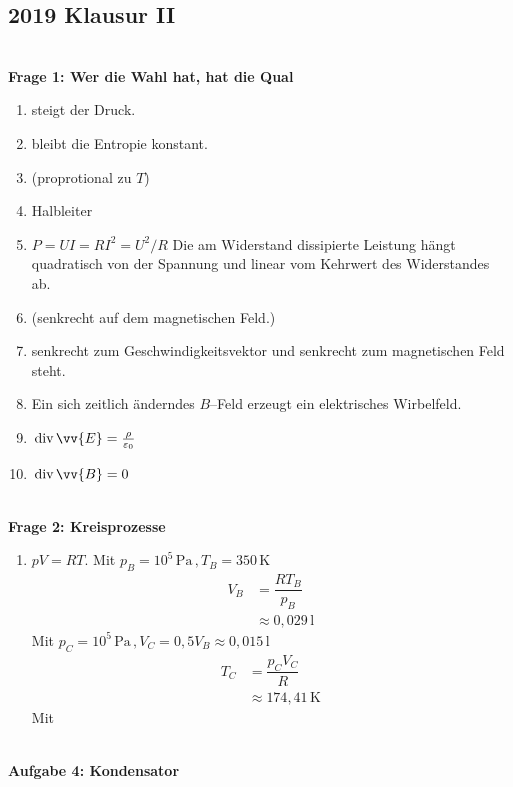 \documentclass[a4paper,12pt]{article}
\numberwithin{equation}{section}
\begin{document}
\subsection{2019 Klausur II}
\hfill\\\textbf{Frage 1: Wer die Wahl hat, hat die Qual}
\begin{enumerate}[label=\arabic*.)]
        \item steigt der Druck.
        \item bleibt die Entropie konstant.
        \item (proprotional zu $T$)
        \item Halbleiter
        \item $P=UI=RI^2=U^2/R$ Die am Widerstand dissipierte Leistung hängt quadratisch von der Spannung und linear vom Kehrwert des Widerstandes ab.
        \item (senkrecht auf dem magnetischen Feld.)
        \item senkrecht zum Geschwindigkeitsvektor und senkrecht zum magnetischen Feld steht.
        \item Ein sich zeitlich änderndes $B$--Feld erzeugt ein elektrisches Wirbelfeld.
        \item $\,\text{div}\,\vv{E}=\tfrac{\rho }{\varepsilon _0}$
        \item $\,\text{div}\,\vv{B}=0$ 
\end{enumerate}
\hfill\\\textbf{Frage 2: Kreisprozesse}
\begin{enumerate}[label=(\alph*)]
        \item $pV=RT$. Mit $p_B=10^5\,\text{Pa}\,,T_B=350\,\text{K}\,$ 
                \begin{align*} 
                        V_B&=\dfrac{RT_B}{p_B}\\
                           &\approx 0,029\,\text{l}\,
                \end{align*} 
               Mit $p_C=10^5\,\text{Pa}\,,V_C=0,5V_B\approx 0,015\,\text{l}\,$ 
               \begin{align*} 
                        T_C&=\dfrac{p_CV_C}{R}\\
                           &\approx 174,41\,\text{K}\,
               \end{align*} 
               Mit 
\end{enumerate}
\hfill\\\textbf{Aufgabe 4: Kondensator}
\end{document}
